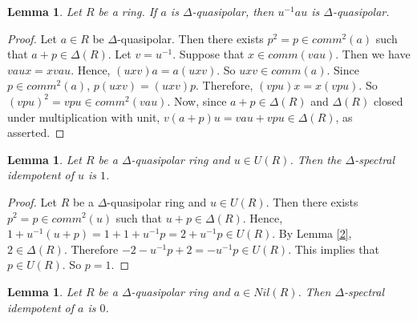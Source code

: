 \documentclass[12pt, reqno]{amsart}
\newtheorem{lem}[thm]{Lemma}
\numberwithin{equation}{section}
\begin{document}
\begin{lem}
    Let $R$ be a ring. If $a$ is $\Delta$-quasipolar, then $u^{-1}au$ is $\Delta$-quasipolar.
\end{lem}

\begin{proof}
    Let $a\in R$ be $\Delta$-quasipolar. Then there exists $p^2=p\in comm^2(a)$ such that $a+p\in \Delta(R)$. Let $v=u^{-1}$. Suppose that $x\in comm(vau)$. Then we have $vaux=xvau$. Hence, $(uxv)a=a(uxv)$. So $uxv\in comm(a)$. Since $p\in comm^2(a)$, $p(uxv)=(uxv)p$. Therefore, $(vpu)x=x(vpu)$. So $(vpu)^2=vpu \in comm^2(vau)$. Now, since $a+p\in \Delta(R)$ and $\Delta(R)$ closed under multiplication with unit, $v(a+p)u=vau+vpu\in \Delta(R)$, as asserted.
\end{proof}

\begin{lem}\label{invidem}
    Let $R$ be a $\Delta$-quasipolar ring and $u\in U(R)$. Then the $\Delta$-spectral idempotent of $u$ is $1$.
\end{lem}

\begin{proof}
    Let $R$ be a $\Delta$-quasipolar ring and $u\in U(R)$. Then there exists $p^2=p\in comm^2(u)$ such that $u+p\in \Delta(R)$. Hence, $1+u^{-1}(u+p)=1+1+u^{-1}p=2+u^{-1}p\in U(R)$. By Lemma \ref{2}, $2\in \Delta(R)$. Therefore $-2-u^{-1}p+2=-u^{-1}p\in U(R)$. This implies that $p\in U(R)$. So $p=1$.
\end{proof}

\begin{lem}
    Let $R$ be a $\Delta$-quasipolar ring and $a\in Nil(R)$. Then  $\Delta$-spectral idempotent of $a$ is $0$.
\end{lem}
\end{document}
